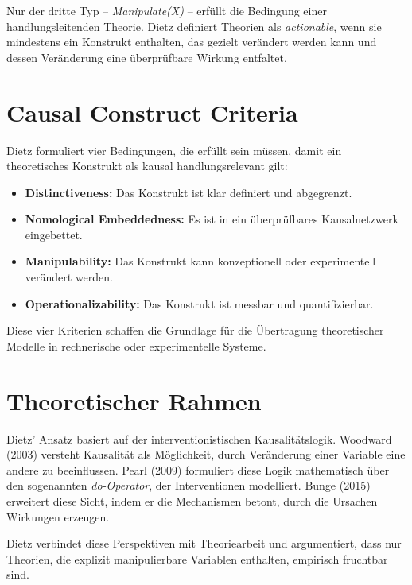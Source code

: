 \documentclass[12pt,a4paper]{article}
\begin{document}
Nur der dritte Typ -- \textit{Manipulate(X)} -- erfüllt die Bedingung einer handlungsleitenden Theorie.
Dietz definiert Theorien als \textit{actionable}, wenn sie mindestens ein Konstrukt enthalten, das gezielt verändert werden kann und dessen Veränderung eine überprüfbare Wirkung entfaltet.

\section{Causal Construct Criteria}

Dietz formuliert vier Bedingungen, die erfüllt sein müssen, damit ein theoretisches Konstrukt als kausal handlungsrelevant gilt:

\begin{itemize}[leftmargin=1.5em]
    \item \textbf{Distinctiveness:} Das Konstrukt ist klar definiert und abgegrenzt.
    \item \textbf{Nomological Embeddedness:} Es ist in ein überprüfbares Kausalnetzwerk eingebettet.
    \item \textbf{Manipulability:} Das Konstrukt kann konzeptionell oder experimentell verändert werden.
    \item \textbf{Operationalizability:} Das Konstrukt ist messbar und quantifizierbar.
\end{itemize}

Diese vier Kriterien schaffen die Grundlage für die Übertragung theoretischer Modelle in rechnerische oder experimentelle Systeme.

\section{Theoretischer Rahmen}

Dietz' Ansatz basiert auf der interventionistischen Kausalitätslogik.
Woodward (2003) versteht Kausalität als Möglichkeit, durch Veränderung einer Variable eine andere zu beeinflussen.
Pearl (2009) formuliert diese Logik mathematisch über den sogenannten \textit{do-Operator}, der Interventionen modelliert.
Bunge (2015) erweitert diese Sicht, indem er die Mechanismen betont, durch die Ursachen Wirkungen erzeugen.

Dietz verbindet diese Perspektiven mit Theoriearbeit und argumentiert, dass nur Theorien, die explizit manipulierbare Variablen enthalten, empirisch fruchtbar sind.
\end{document}
